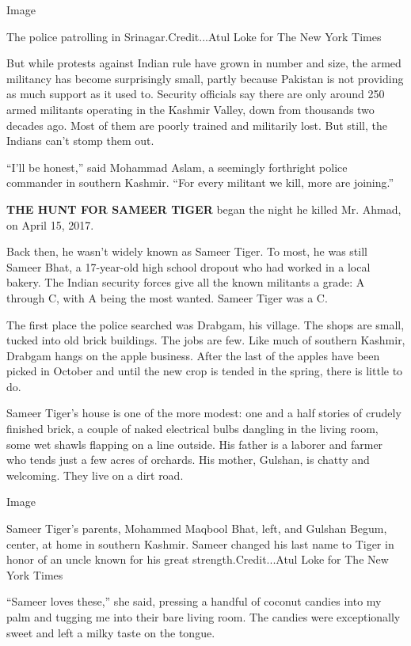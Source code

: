 Image

The police patrolling in Srinagar.Credit...Atul Loke for The New York
Times

But while protests against Indian rule have grown in number and size,
the armed militancy has become surprisingly small, partly because
Pakistan is not providing as much support as it used to. Security
officials say there are only around 250 armed militants operating in the
Kashmir Valley, down from thousands two decades ago. Most of them are
poorly trained and militarily lost. But still, the Indians can't stomp
them out.

``I'll be honest,'' said Mohammad Aslam, a seemingly forthright police
commander in southern Kashmir. ``For every militant we kill, more are
joining.''

\textbf{THE HUNT FOR SAMEER TIGER} began the night he killed Mr. Ahmad,
on April 15, 2017.

Back then, he wasn't widely known as Sameer Tiger. To most, he was still
Sameer Bhat, a 17-year-old high school dropout who had worked in a local
bakery. The Indian security forces give all the known militants a grade:
A through C, with A being the most wanted. Sameer Tiger was a C.

The first place the police searched was Drabgam, his village. The shops
are small, tucked into old brick buildings. The jobs are few. Like much
of southern Kashmir, Drabgam hangs on the apple business. After the last
of the apples have been picked in October and until the new crop is
tended in the spring, there is little to do.

Sameer Tiger's house is one of the more modest: one and a half stories
of crudely finished brick, a couple of naked electrical bulbs dangling
in the living room, some wet shawls flapping on a line outside. His
father is a laborer and farmer who tends just a few acres of orchards.
His mother, Gulshan, is chatty and welcoming. They live on a dirt road.

Image

Sameer Tiger's parents, Mohammed Maqbool Bhat, left, and Gulshan Begum,
center, at home in southern Kashmir. Sameer changed his last name to
Tiger in honor of an uncle known for his great strength.Credit...Atul
Loke for The New York Times

``Sameer loves these,'' she said, pressing a handful of coconut candies
into my palm and tugging me into their bare living room. The candies
were exceptionally sweet and left a milky taste on the tongue.

